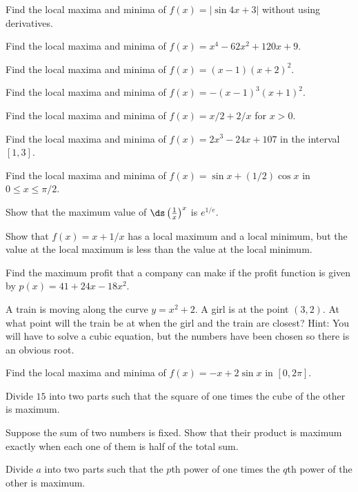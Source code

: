 \begin{multicols}{2}
  \problem Find the local maxima and minima of $f(x)=|\sin 4x + 3|$ without
  using derivatives.


  \problem Find the local maxima and minima of $f(x)=x^4-62x^2+120x+9$.


  \problem Find the local maxima and minima of $f(x)=(x-1)(x+2)^2$.


  \problem Find the local maxima and minima of $f(x)=-(x-1)^3(x+1)^2$.


  \problem Find the local maxima and minima of $f(x)=x/2+2/x$ for $x>0$.

  \problem Find the local maxima and minima of $f(x)=2x^3-24x+107$ in the
  interval $[1,3]$.

  \problem Find the local maxima and minima of $f(x)=\sin x+(1/2)\cos x$ in
  $0\le x\le \pi/2$.




  \problem Show that the maximum value of $\ds \left(\frac{1}{ x}\right)^x$
  is $e^{1/e}$.




  \problem Show that $f(x)=x+1/x$ has a local maximum and a local minimum,
  but the value at the local maximum is less than the value at the local
  minimum.




  \problem Find the maximum profit that a company can make if the profit
  function is given by $p(x)=41+24x-18x^2$.




  \problem A train is moving along the curve $y=x^2+2$.  A girl is at the
  point $(3,2)$.  At what point will the train be at when the girl and the
  train are closest?  Hint: You will have to solve a cubic equation, but the
  numbers have been chosen so there is an obvious root.




  \problem Find the local maxima and minima of $f(x)=-x+2\sin x$ in
  $[0,2\pi]$.




  \problem Divide $15$ into two parts such that the square of one times the
  cube of the other is maximum.




  \problem Suppose the sum of two numbers is fixed.  Show that their product
  is maximum exactly when each one of them is half of the total sum.




  \problem Divide $a$ into two parts such that the $p$th power of one times
  the $q$th power of the other is maximum.





\end{multicols}
